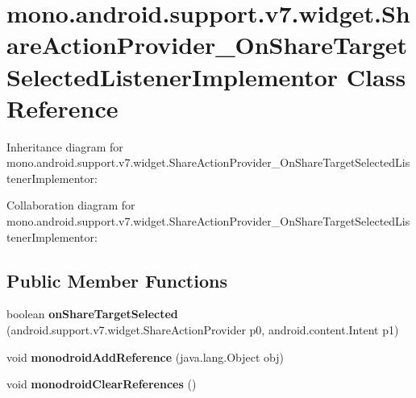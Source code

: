 \hypertarget{classmono_1_1android_1_1support_1_1v7_1_1widget_1_1_share_action_provider___on_share_target_selected_listener_implementor}{}\section{mono.\+android.\+support.\+v7.\+widget.\+Share\+Action\+Provider\+\_\+\+On\+Share\+Target\+Selected\+Listener\+Implementor Class Reference}
\label{classmono_1_1android_1_1support_1_1v7_1_1widget_1_1_share_action_provider___on_share_target_selected_listener_implementor}


Inheritance diagram for mono.\+android.\+support.\+v7.\+widget.\+Share\+Action\+Provider\+\_\+\+On\+Share\+Target\+Selected\+Listener\+Implementor\+:


Collaboration diagram for mono.\+android.\+support.\+v7.\+widget.\+Share\+Action\+Provider\+\_\+\+On\+Share\+Target\+Selected\+Listener\+Implementor\+:
\subsection*{Public Member Functions}
\begin{DoxyCompactItemize}
\item 
\mbox{\label{classmono_1_1android_1_1support_1_1v7_1_1widget_1_1_share_action_provider___on_share_target_selected_listener_implementor_acd158ea7fad91d537c19f92888995fad}} 
boolean {\bfseries on\+Share\+Target\+Selected} (android.\+support.\+v7.\+widget.\+Share\+Action\+Provider p0, android.\+content.\+Intent p1)
\item 
\mbox{\label{classmono_1_1android_1_1support_1_1v7_1_1widget_1_1_share_action_provider___on_share_target_selected_listener_implementor_a56c3e72e0afae02044279e72744f2c14}} 
void {\bfseries monodroid\+Add\+Reference} (java.\+lang.\+Object obj)
\item 
\mbox{\label{classmono_1_1android_1_1support_1_1v7_1_1widget_1_1_share_action_provider___on_share_target_selected_listener_implementor_a6365fd94f326b807c545489837189d68}} 
void {\bfseries monodroid\+Clear\+References} ()
\end{DoxyCompactItemize}
